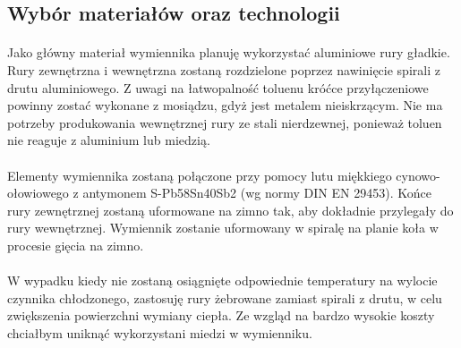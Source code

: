 \subsection{Wybór materiałów oraz technologii}
\paragraph{}{
    Jako główny materiał wymiennika planuję wykorzystać aluminiowe rury gładkie.
    Rury zewnętrzna i wewnętrzna zostaną rozdzielone poprzez nawinięcie spirali z drutu aluminiowego.
    Z uwagi na łatwopalność toluenu króćce przyłączeniowe powinny zostać wykonane z mosiądzu, gdyż jest metalem nieiskrzącym.
    Nie ma potrzeby produkowania wewnętrznej rury ze stali nierdzewnej, ponieważ toluen nie reaguje z aluminium lub miedzią.
}
\paragraph{}{
    Elementy wymiennika zostaną połączone przy pomocy lutu miękkiego cynowo-ołowiowego z antymonem S-Pb58Sn40Sb2 (wg normy DIN EN 29453).
    Końce rury zewnętrznej zostaną uformowane na zimno tak, aby dokładnie przylegały do rury wewnętrznej.
    Wymiennik zostanie uformowany w spiralę na planie koła w procesie gięcia na zimno.
}
\paragraph{}{
    W wypadku kiedy nie zostaną osiągnięte odpowiednie temperatury na wylocie czynnika chłodzonego, zastosuję rury żebrowane zamiast spirali z drutu, w celu zwiększenia powierzchni wymiany ciepła.
    Ze wzgląd na bardzo wysokie koszty chciałbym uniknąć wykorzystani miedzi w wymienniku.
}
